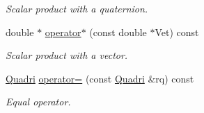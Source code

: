 \begin{DoxyCompactItemize}
\begin{DoxyCompactList}\small\item\em \-Scalar product with a quaternion. \end{DoxyCompactList}\item 
\hypertarget{classQuadri_ae1ed8743a6f69bae7fe2fce6e5969e45}{double $\ast$ \hyperlink{classQuadri_ae1ed8743a6f69bae7fe2fce6e5969e45}{operator$\ast$} (const double $\ast$\-Vet) const }\label{classQuadri_ae1ed8743a6f69bae7fe2fce6e5969e45}

\begin{DoxyCompactList}\small\item\em \-Scalar product with a vector. \end{DoxyCompactList}\item 
\hypertarget{classQuadri_aa0fe30f9a827de40be66d54c38b45cce}{\hyperlink{classQuadri}{\-Quadri} \hyperlink{classQuadri_aa0fe30f9a827de40be66d54c38b45cce}{operator=} (const \hyperlink{classQuadri}{\-Quadri} \&rq) const }\label{classQuadri_aa0fe30f9a827de40be66d54c38b45cce}

\begin{DoxyCompactList}\small\item\em \-Equal operator. \end{DoxyCompactList}\end{DoxyCompactItemize}
